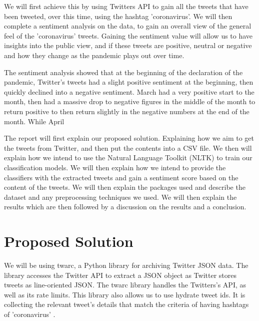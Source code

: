 \documentclass[a4paper,10pt]{article}
\begin{document}
We will first achieve this by using Twitters API to gain all the tweets that have been tweeted, over this time, using the hashtag 'coronavirus'. We will then complete a sentiment analysis on the data, to gain an overall view of the general feel of the 'coronavirus' tweets. Gaining the sentiment value will allow us to have insights into the public view, and if these tweets are positive, neutral or negative and how they change as the pandemic plays out over time. 

The sentiment analysis showed that at the beginning of the declaration of the pandemic, Twitter's tweets had a slight positive sentiment at the beginning, then quickly declined into a negative sentiment. March had a very positive start to the month, then had a massive drop to negative figures in the middle of the month to return positive to then return slightly in the negative numbers at the end of the month. While April 

The report will first explain our proposed solution. Explaining how we aim to get the tweets from Twitter, and then put the contents into a CSV file. We then will explain how we intend to use the Natural Language Toolkit (NLTK) to train our classification models. We will then explain how we intend to provide the classifiers with the extracted tweets and gain a sentiment score based on the content of the tweets. We will then explain the packages used and describe the dataset and any preprocessing techniques we used. We will then explain the results which are then followed by a discussion on the results and a conclusion.

\section{Proposed Solution}
We will be using twarc, a Python library for archiving Twitter JSON data. The library accesses the Twitter API to extract a JSON object as Twitter stores tweets as line-oriented JSON. The twarc library handles the Twitters's API, as well as its rate limits. This library also allows us to use hydrate tweet ids. It is collecting the relevant tweet's details that match the criteria of having hashtags of 'coronavirus' \cite{twarc}.
\end{document}
